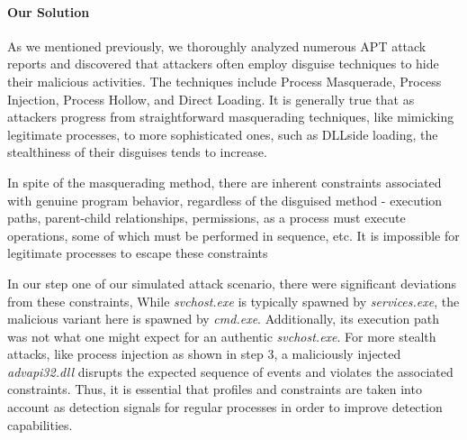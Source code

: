 \paragraph{Our Solution}
\label{sec:intuition}
As we mentioned previously, we thoroughly analyzed numerous APT attack
reports\cite{eclecticiq2023,microsoft2023,paloaltonetworks2023} and discovered that attackers often employ disguise techniques to hide their malicious activities.
The techniques include Process Masquerade, Process Injection, Process Hollow, and Direct Loading.
It is generally true that as attackers progress from straightforward masquerading techniques, like mimicking legitimate processes, to more sophisticated ones, such as DLL\-side loading, the stealthiness of their disguises tends to increase.

In spite of the masquerading method, there are inherent constraints associated with genuine program behavior, regardless of the disguised method - execution paths, parent-child relationships, permissions, as a process must execute operations, some of which must be performed in sequence, etc. It is impossible for legitimate processes to escape these constraints

In our step one of our simulated attack scenario, there were significant deviations from these constraints, While \textit{svchost.exe} is typically spawned by \textit{services.exe}, the malicious variant here is spawned by \textit{cmd.exe}. Additionally, its execution path was not what one might expect for an authentic \textit{svchost.exe}.
For more stealth attacks, like process injection as shown in step 3, a maliciously injected \textit{advapi32.dll} disrupts the expected sequence of events and violates the associated constraints. Thus, it is essential that profiles and constraints are taken into account as detection signals for regular processes in order to improve detection capabilities.




